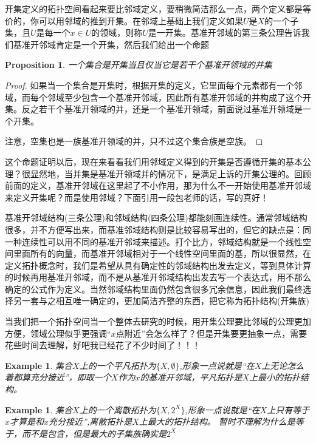 \documentclass{article}
\newtheorem{proposition}[theorem]{Proposition}
\newtheorem{example}[theorem]{Example}
\begin{document}
开集定义的拓扑空间看起来要比邻域定义，要稍微简洁那么一点，两个定义都是等价的，你可以用邻域的推到开集。在邻域上基础上我们定义如果$U$是$X$的一个子集，且$U$是每一个$x \in U$的领域，则称$U$是一开集。基准开邻域的第三条公理告诉我们基准开邻域肯定是一个开集，然后我们给出一个命题

\begin{proposition}
一个集合是开集当且仅当它是若干个基准开领域的并集
\end{proposition}

\begin{proof}
如果当一个集合是开集时，根据开集的定义，它里面每个元素都有一个邻域，而每个邻域至少包含一个基准开邻域，因此所有基准开邻域的并构成了这个开集。反之若干个基准开领域的并，还是一个基准开领域，前面说过基准开领域是一个开集。

注意，空集也是一族基准开领域的并，只不过这个集合族是空族。
\end{proof}

这个命题证明以后，现在来看看我们用邻域定义得到的开集是否遵循开集的基本公理？很显然地，当并集是基准开领域并的情况下，是满足上诉的开集公理的。回顾前面的定义，基准开邻域在这里起了不小作用，那为什么不一开始使用基准开邻域来定义开集呢？而是使用邻域？下面引用一段包老师的话，写的真好！

基准开邻域结构(三条公理)和邻域结构(四条公理)都能刻画连续性。通常邻域结构很多，并不方便写出来，而基准邻域结构则是比较容易写出的，但它的缺点是：同一种连续性可以用不同的基准开邻域来描述。打个比方，邻域结构就是一个线性空间里面所有的向量，而基准开邻域相对于一个线性空间里面的基，所以很显然，在定义拓扑概念时，我们是希望从具有确定性的邻域结构出发去定义，等到具体计算的时候再用基准开邻域，而不是从基准开邻域结构出发去写一个表达式，用不那么确定的公式作为定义。当然邻域结构里面仍然包含很多冗余信息，因此我们最终选择另一套与之相互唯一确定的，更加简洁齐整的东西，把它称为拓扑结构(开集族)

当我们把一个拓扑空间当一个整体去研究的时候，用开集公理要比邻域的公理更加方便，领域公理似乎更强调“$x$点附近”会怎么样了？但是开集要更抽象一点，需要花些时间去理解，好吧我已经花了不少时间了！！！

\begin{example}
集合$X$上的一个平凡拓扑为$\{X,\emptyset\}$,形象一点说就是“在$X$上无论怎么着都算充分接近”，即取一个$X$作为$x$的基准开邻域，平凡拓扑是$X$上最小的拓扑结构。
\end{example}

\begin{example}
集合$X$上的一个离散拓扑为$\{X,2^{X}\}$,形象一点说就是“在$X$上只有等于$x$才算是和$x$充分接近”,离散拓扑是$X$上最大的拓扑结构。 暂时不理解为什么是等于，而不是包含，但是最大的子集族确实是$2^{X}$
\end{example}
\end{document}
